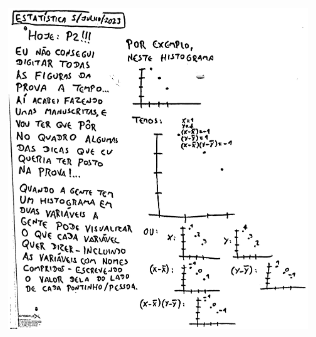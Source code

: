 \documentclass[oneside,12pt]{article}
\begin{document}
\newpage


\vspace*{-1cm}

\includegraphics[height=8.5cm]{2023-1-ES/est-P2-quadro.pdf}


\newpage

%                        

\vspace*{-0.5cm}
\end{document}
